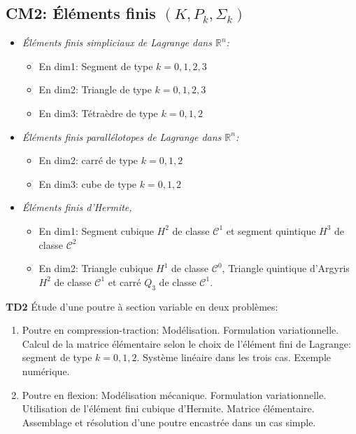 \documentclass{article}
\begin{document}
\subsection*{CM2: Éléments finis $(K,P_k,\Sigma_k)$}
\begin{itemize}[label=\textbullet, font=\small \color{greenESTP}]
\item {\em Éléments finis simpliciaux de Lagrange  dans $\mathbb{R}^n$:}  
\begin{itemize}
\item En dim1: Segment de type $k=0,1,2,3$
\item En dim2: Triangle de type $k=0,1,2,3$
\item En dim3: Tétraèdre de type $k=0,1,2$
\end{itemize}
\item {\em Éléments finis parallélotopes de Lagrange dans $\mathbb{R}^n$:}
\begin{itemize}
\item En dim2: carré de type $k=0,1,2$
\item En dim3: cube de type $k=0,1,2$
\end{itemize}
\item {\em Éléments finis d'Hermite,}%
\begin{itemize}
\item En dim1: Segment cubique $H^2$ de classe $\mathcal{C}^1$ et segment quintique $H^3$ de classe $\mathcal{C}^2$
\item En dim2: Triangle cubique $H^1$ de classe $\mathcal{C}^0$,  Triangle quintique d'Argyris $H^2$ de classe $\mathcal{C}^1$ et carré $Q_3$ de classe $\mathcal{C}^1$.  
\end{itemize}
\end{itemize}
{\bf TD2} Étude d'une poutre à section variable en deux problèmes:
\begin{enumerate}
\item Poutre en compression-traction: Modélisation. Formulation variationnelle. Calcul de la matrice élémentaire selon le choix de l'élément fini de Lagrange: segment de type $k=0,1,2$. Système linéaire dans les trois cas. Exemple numérique.
\item Poutre en flexion: Modélisation mécanique. Formulation variationnelle. Utilisation de l'élément fini cubique d'Hermite. Matrice élémentaire. Assemblage et résolution d'une poutre encastrée dans un cas simple.
\end{enumerate}
 
\end{document}
